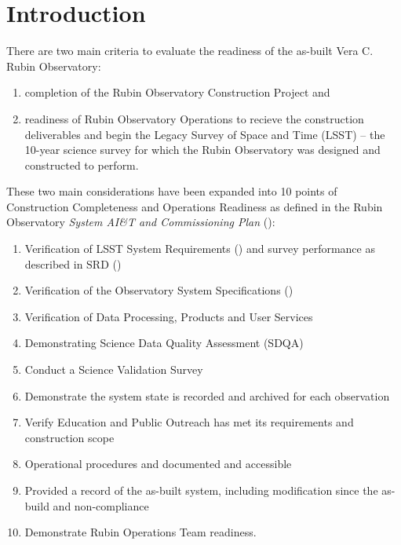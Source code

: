 
\section {Introduction}

There are two main criteria to evaluate the readiness of the as-built Vera C. Rubin Observatory:

\begin{enumerate}

        \item completion of the Rubin Observatory Construction Project and

        \item readiness of Rubin Observatory Operations to recieve the construction deliverables and begin the Legacy Survey of Space and Time (LSST) -- the 10-year science survey for which the Rubin Observatory was designed and constructed to perform.

\end{enumerate}

These two main considerations have been expanded into 10 points of Construction Completeness and Operations Readiness as defined in the Rubin Observatory {\it System AI\&T and Commissioning Plan} ():


\begin{enumerate}
        \item Verification of LSST System Requirements () and survey performance as described in SRD ()
        \item Verification of the Observatory System Specifications ()
        \item Verification of Data Processing, Products and User Services
        \item Demonstrating Science Data Quality Assessment (SDQA)
        \item Conduct a Science Validation Survey
        \item Demonstrate the system state is recorded and archived for each observation
        \item Verify Education and Public Outreach has met its requirements and construction scope
        \item Operational procedures and documented and accessible
        \item Provided a record of the as-built system, including modification since the as-build and non-compliance
        \item Demonstrate Rubin Operations Team readiness.
\end{enumerate}

